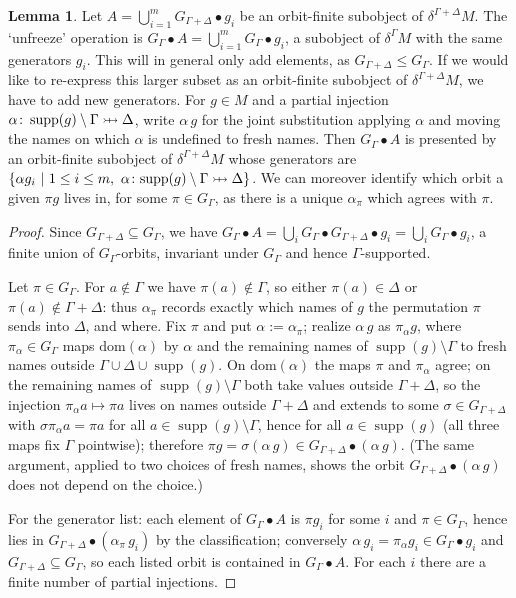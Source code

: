 \documentclass{article}
\theoremstyle{definition}
\newtheorem{lemma}{Lemma}[section]
\newcommand{\prightarrowtail}{\mathrel{\ooalign{\hfil$\mapstochar\mkern5mu$\hfil\cr$\rightarrowtail$\cr}}}
\newcommand{\supp}{\operatorname{supp}}
\begin{document}
\begin{lemma}
    \label{lemma:orbitrefine}
    Let $A=\bigcup^m_{i=1} G_{\Gamma+\Delta}\bullet g_i$ be an orbit-finite subobject of $\delta^{\Gamma+\Delta} M$. 
    The `unfreeze' operation is $G_\Gamma\bullet A=\bigcup^m_{i=1} G_\Gamma\bullet g_i$, a subobject of $\delta^{\Gamma}M$ with the same generators $g_i$. This will in general only add elements, as $G_{\Gamma+\Delta }\leq G_\Gamma$. If we would like to re-express this larger subset as an  orbit-finite subobject of $\delta^{\Gamma+\Delta} M$, we have to add new generators.  
    For $g\in M$ and a partial injection
    $\alpha\colon\supp(g)\setminus\Gamma\prightarrowtail\Delta$, write
    $\alpha\,g$ for the joint substitution applying $\alpha$ and moving the names on which $\alpha$ is undefined to fresh names. 
    Then $G_\Gamma\bullet A$ is presented by an orbit-finite subobject of $\delta^{\Gamma+\Delta} M$ whose generators are $\{\alpha g_i\ |\ 1 \leq i \leq m,\ \alpha\colon {\supp(g)\setminus\Gamma\prightarrowtail\Delta}\}$. We can moreover identify which orbit a given $\pi g$ lives in, for some $\pi \in G_\Gamma$, as there is a unique $\alpha_\pi$ which agrees with $\pi$.
\end{lemma}
\begin{proof}
Since $G_{\Gamma+\Delta}\subseteq G_\Gamma$, we have
$G_\Gamma\bullet A=\bigcup_i G_\Gamma\bullet G_{\Gamma+\Delta}\bullet g_i
=\bigcup_i G_\Gamma\bullet g_i$, a finite union of $G_\Gamma$-orbits,
invariant under $G_\Gamma$ and hence $\Gamma$-supported.
 
Let $\pi \in G_\Gamma$. For $a\notin\Gamma$ we have
$\pi(a)\notin\Gamma$, so either $\pi(a)\in\Delta$ or
$\pi(a)\notin\Gamma+\Delta$: thus $\alpha_\pi$ records exactly which names
of $g$ the permutation $\pi$ sends into $\Delta$, and where. Fix $\pi$ and
put $\alpha:=\alpha_\pi$; realize $\alpha\,g$ as $\pi_\alpha g$, where
$\pi_\alpha\in G_\Gamma$ maps $\mathrm{dom}(\alpha)$ by $\alpha$ and the
remaining names of $\supp(g)\setminus\Gamma$ to fresh names outside
$\Gamma\cup\Delta\cup\supp(g)$. On $\mathrm{dom}(\alpha)$ the maps $\pi$
and $\pi_\alpha$ agree; on the remaining names of
$\supp(g)\setminus\Gamma$ both take values outside $\Gamma+\Delta$, so the
injection $\pi_\alpha a\mapsto\pi a$ lives on names outside
$\Gamma+\Delta$ and extends to some $\sigma\in G_{\Gamma+\Delta}$ with
$\sigma\pi_\alpha a=\pi a$ for all $a\in\supp(g)\setminus\Gamma$, hence
for all $a\in\supp(g)$ (all three maps fix $\Gamma$ pointwise); therefore
$\pi g=\sigma(\alpha\,g)\in G_{\Gamma+\Delta}\bullet(\alpha\,g)$. (The
same argument, applied to two choices of fresh names, shows the orbit
$G_{\Gamma+\Delta}\bullet(\alpha\,g)$ does not depend on the choice.)
 
For the generator list: each element of $G_\Gamma\bullet A$ is $\pi g_i$
for some $i$ and $\pi\in G_\Gamma$, hence lies in
$G_{\Gamma+\Delta}\bullet(\alpha_{\pi}\,g_i)$ by the classification;
conversely $\alpha\,g_i=\pi_\alpha g_i\in G_\Gamma\bullet g_i$ and
$G_{\Gamma+\Delta}\subseteq G_\Gamma$, so each listed orbit is contained
in $G_\Gamma\bullet A$. For each $i$ there are
a finite number of
partial injections.
\end{proof}
\end{document}
